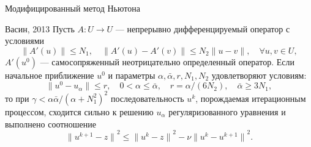 \documentclass[10pt,pdf, mathserif, hyperref={unicode}]{beamer}
\begin{document}
\begin{frame}{\small Модифицированный метод Ньютона}
	\begin{block}{Васин, 2013}
		Пусть $A: U \to U$ --- непрерывно дифференцируемый оператор с условиями
		$$\|A'(u)\|\le N_1, \quad \|A'(u) - A'(v)\|\le N_2\|u-v\|, \quad \forall u, v \in U,$$
		$A'(u^0)$ --- самосопряженный неотрицательно определенный оператор. Если начальное приближение $u^0$ и параметры $\alpha, \bar{\alpha}, r, N_1, N_2$ удовлетворяют условиям:
		$$\|u^0-u_\alpha\|\le r, \quad 0<\alpha\le \bar{\alpha}, \quad r=\alpha/(6N_2), \quad \bar{\alpha}\ge 3N_1,$$
		то при $\gamma<\alpha\bar{\alpha}/(\alpha+N_1^2)^2$ последовательность $u^k$, порождаемая итерационным процессом, сходится сильно к решению $u_\alpha$ регуляризованного уравнения и выполнено соотношение
		$${\|u^{k+1}-z\|}^2\le{\|u^k-z\|}^2-\nu{\|u^k-u^{k+1}\|}^2.$$
	\end{block}
	\let\thefootnote\relax\let\thefootnote\relax{}
\end{frame}
\end{document}
